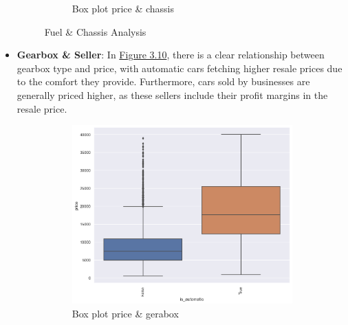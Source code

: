\begin{itemize}
\begin{figure}[!h]
\begin{subfigure}[b]{0.48\linewidth}
            \caption{Box plot price \& chassis}
            \label{fig:chassis-box}
        \end{subfigure}
        \caption{Fuel \& Chassis Analysis}
        \label{fig:fuel-chassis-analysis}
    \end{figure}

    \item \textbf{Gearbox \& Seller}: In \hyperref[fig:gearbox-seller-analysis]{Figure 3.10}, there is a clear relationship between gearbox type and price, with automatic cars fetching higher resale prices due to the comfort they provide. Furthermore, cars sold by businesses are generally priced higher, as these sellers include their profit margins in the resale price.

    \begin{figure}[!h]
        \begin{subfigure}[b]{0.48\linewidth}
            \centering
            \includegraphics[width=\linewidth]{images/priceprediction/boxplots/is_automatic_price.png}
            \caption{Box plot price \& gerabox}
            \label{fig:gearbox-box}
        \end{subfigure}
        \hfill
        \begin{subfigure}[b]{0.48\linewidth}
            \centering

\end{subfigure}
\end{figure}
\end{itemize}
